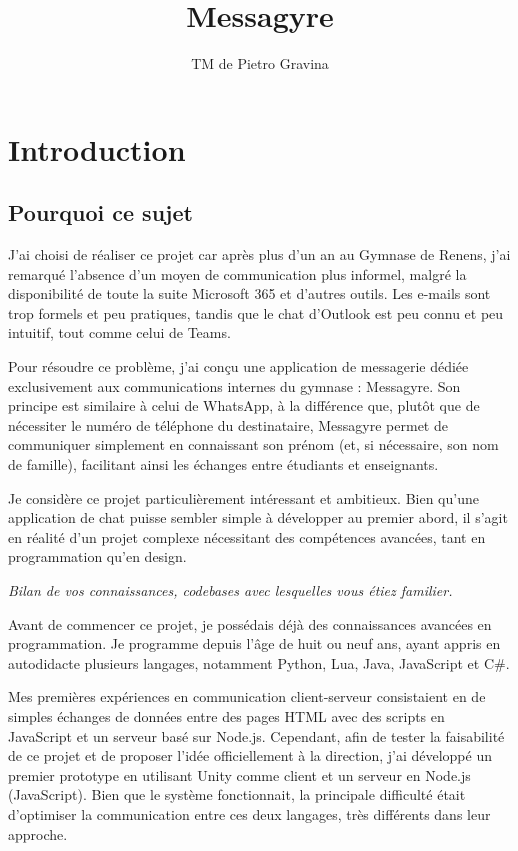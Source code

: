 \documentclass{article}
\title{Messagyre}
\author{TM de Pietro Gravina}
\begin{document}
\maketitle

\section{Introduction}

\subsection{Pourquoi ce sujet}

J’ai choisi de réaliser ce projet car après plus d’un an au Gymnase de Renens, j’ai remarqué l’absence d’un moyen de communication plus informel, malgré la disponibilité de toute la suite Microsoft 365 et d’autres outils. Les e-mails sont trop formels et peu pratiques, tandis que le chat d’Outlook est peu connu et peu intuitif, tout comme celui de Teams.

Pour résoudre ce problème, j’ai conçu une application de messagerie dédiée exclusivement aux communications internes du gymnase : Messagyre. Son principe est similaire à celui de WhatsApp, à la différence que, plutôt que de nécessiter le numéro de téléphone du destinataire, Messagyre permet de communiquer simplement en connaissant son prénom (et, si nécessaire, son nom de famille), facilitant ainsi les échanges entre étudiants et enseignants.

Je considère ce projet particulièrement intéressant et ambitieux. Bien qu’une application de chat puisse sembler simple à développer au premier abord, il s’agit en réalité d’un projet complexe nécessitant des compétences avancées, tant en programmation qu’en design.

\textit{Bilan de vos connaissances, codebases avec lesquelles vous étiez familier. }

Avant de commencer ce projet, je possédais déjà des connaissances avancées en programmation. Je programme depuis l’âge de huit ou neuf ans, ayant appris en autodidacte plusieurs langages, notamment Python, Lua, Java, JavaScript et C\#.

Mes premières expériences en communication client-serveur consistaient en de simples échanges de données entre des pages HTML avec des scripts en JavaScript et un serveur basé sur Node.js. Cependant, afin de tester la faisabilité de ce projet et de proposer l’idée officiellement à la direction, j’ai développé un premier prototype en utilisant Unity comme client et un serveur en Node.js (JavaScript). Bien que le système fonctionnait, la principale difficulté était d’optimiser la communication entre ces deux langages, très différents dans leur approche.
\end{document}
